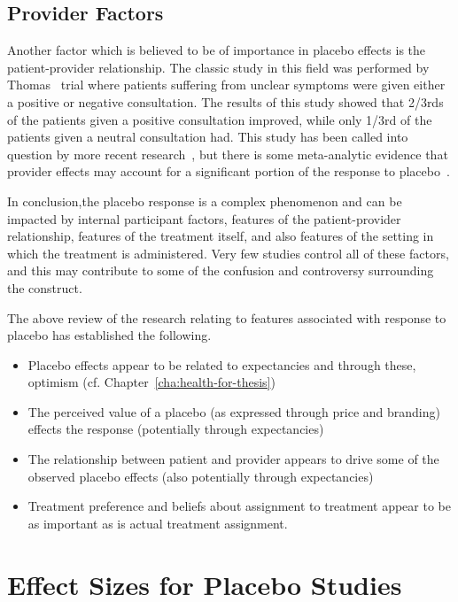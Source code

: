 \subsection{Provider Factors}

Another factor which is believed to be of importance in placebo effects is the patient-provider relationship. The classic study in this field was performed by Thomas~\cite{Thomas1994}  trial where  patients suffering from unclear symptoms were given either a positive or negative consultation.  The results of this study showed that 2/3rds of the patients given a positive consultation improved, while only 1/3rd of the patients given a neutral consultation had. This study has been called into question by more recent research~\cite{Knipschild2005}, but there is some meta-analytic evidence that provider effects may account for a significant portion of the response to placebo~\cite{DiBlasi2001}.



In conclusion,the placebo response is a complex phenomenon and can be impacted by internal  participant factors, features of the patient-provider relationship, features of the treatment itself, and also features of the setting in which the treatment is administered. Very few studies control all of these factors, and this may contribute to some of the confusion and controversy surrounding the construct. 

The above review of the  research relating to features associated with response to placebo has established the following. 
\begin{itemize}
\item Placebo effects appear to be related to expectancies and through these, optimism (cf. Chapter~\ref{cha:health-for-thesis})
\item The perceived value of a placebo (as expressed through price and branding) effects the response (potentially through expectancies)
\item The relationship between patient and provider appears to drive some of the observed placebo effects (also potentially through expectancies)
\item Treatment preference and beliefs about assignment to treatment appear to be as important as is actual treatment assignment.
\end{itemize}

\section{Effect Sizes for Placebo Studies}

